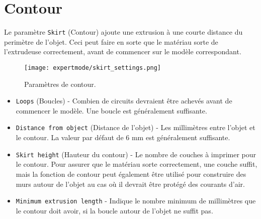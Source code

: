 
\section{Contour} %
\label{sec:skirt}

Le param\`etre \texttt{Skirt} (Contour) ajoute une extrusion \`a une courte distance du perim\`etre de l'objet. Ceci peut faire en sorte que le mat\'eriau sorte de l'extrudeuse correctement, avant de commencer sur le mod\`ele correspondant.

\begin{figure}[H]
\centering
\texttt{[image: expertmode/skirt\_settings.png]}
\caption{Param\`etres de contour.}
\label{fig:skirt_settings}
\end{figure}

\begin{itemize}
    \item \texttt{Loops} (Boucles) - Combien de circuits devraient \^etre achev\'es avant de commencer le mod\`ele. Une boucle est g\'en\'eralement suffisante.
    \item \texttt{Distance from object} (Distance de l'objet) - Les millim\`etres entre l'objet et le contour. La valeur par d\'efaut de 6 mm est g\'en\'eralement suffisante.
    \item \texttt{Skirt height} (Hauteur du contour) - Le nombre de couches \`a imprimer pour le contour. Pour assurer que le mat\'eriau sorte correctement, une couche suffit, mais la fonction de contour peut \'egalement \^etre utilis\'e pour construire des murs autour de l'objet au cas o\`u il devrait \^etre prot\'eg\'e des courants d'air.
    \item \texttt{Minimum extrusion length} - Indique le nombre minimum de millim\`etres que le contour doit avoir, si la boucle autour de l'objet ne suffit pas.
\end{itemize}

